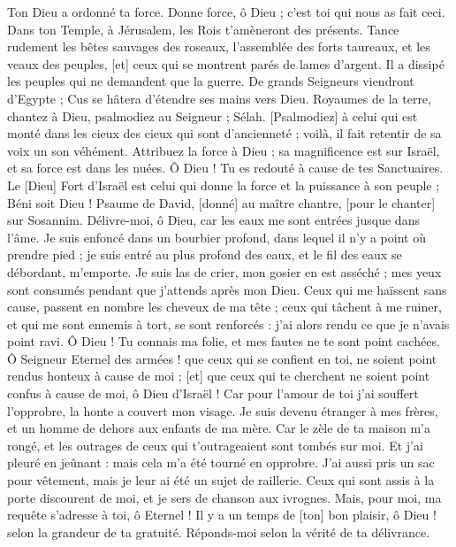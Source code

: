 \begin{multicols}{2}
Ton Dieu a ordonné ta force. Donne force, ô Dieu ; c'est toi qui nous as fait ceci.
Dans ton Temple, à Jérusalem, les Rois t'amèneront des présents.
Tance rudement les bêtes sauvages des roseaux, l'assemblée des forts taureaux, et les veaux des peuples, [et] ceux qui se montrent parés de lames d'argent. Il a dissipé les peuples qui ne demandent que la guerre.
De grands Seigneurs viendront d'Egypte ; Cus se hâtera d'étendre ses mains vers Dieu.
Royaumes de la terre, chantez à Dieu, psalmodiez au Seigneur ; Sélah.
[Psalmodiez] à celui qui est monté dans les cieux des cieux qui sont d'ancienneté ; voilà, il fait retentir de sa voix un son véhément.
Attribuez la force à Dieu ; sa magnificence est sur Israël, et sa force est dans les nuées.
Ô Dieu ! Tu es redouté à cause de tes Sanctuaires. Le [Dieu] Fort d'Israël est celui qui donne la force et la puissance à son peuple ; Béni soit Dieu !
\VerseOne{}Psaume de David, [donné] au maître chantre, [pour le chanter] sur Sosannim. Délivre-moi, ô Dieu, car les eaux me sont entrées jusque dans l'âme.
Je suis enfoncé dans un bourbier profond, dans lequel il n'y a point où prendre pied ; je suis entré au plus profond des eaux, et le fil des eaux se débordant, m'emporte.
Je suis las de crier, mon gosier en est asséché ; mes yeux sont consumés pendant que j'attends après mon Dieu.
Ceux qui me haïssent sans cause, passent en nombre les cheveux de ma tête ; ceux qui tâchent à me ruiner, et qui me sont ennemis à tort, se sont renforcés : j'ai alors rendu ce que je n'avais point ravi.
Ô Dieu ! Tu connais ma folie, et mes fautes ne te sont point cachées.
Ô Seigneur Eternel des armées ! que ceux qui se confient en toi, ne soient point rendus honteux à cause de moi ; [et] que ceux qui te cherchent ne soient point confus à cause de moi, ô Dieu d'Israël !
Car pour l'amour de toi j'ai souffert l'opprobre, la honte a couvert mon visage.
Je suis devenu étranger à mes frères, et un homme de dehors aux enfants de ma mère.
Car le zèle de ta maison m'a rongé, et les outrages de ceux qui t'outrageaient sont tombés sur moi.
Et j'ai pleuré en jeûnant : mais cela m'a été tourné en opprobre.
J'ai aussi pris un sac pour vêtement, mais je leur ai été un sujet de raillerie.
Ceux qui sont assis à la porte discourent de moi, et je sers de chanson aux ivrognes.
Mais, pour moi, ma requête s'adresse à toi, ô Eternel ! Il y a un temps de [ton] bon plaisir, ô Dieu ! selon la grandeur de ta gratuité. Réponds-moi selon la vérité de ta délivrance.

\end{multicols}
